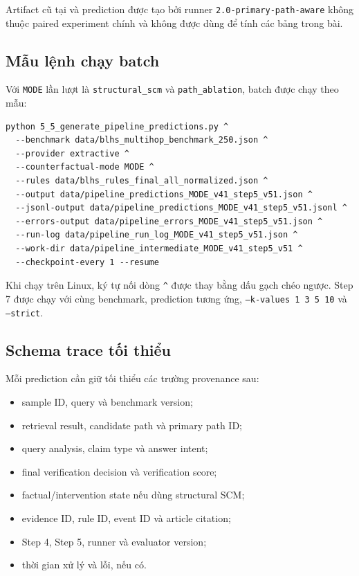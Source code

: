 Artifact cũ tại
 và prediction được tạo bởi
runner \texttt{2.0-primary-path-aware} không thuộc paired experiment chính
và không được dùng để tính các bảng trong bài.

\subsection{Mẫu lệnh chạy batch}

Với \texttt{MODE} lần lượt là \texttt{structural\_scm} và
\texttt{path\_ablation}, batch được chạy theo mẫu:

\begin{verbatim}
python 5_5_generate_pipeline_predictions.py ^
  --benchmark data/blhs_multihop_benchmark_250.json ^
  --provider extractive ^
  --counterfactual-mode MODE ^
  --rules data/blhs_rules_final_all_normalized.json ^
  --output data/pipeline_predictions_MODE_v41_step5_v51.json ^
  --jsonl-output data/pipeline_predictions_MODE_v41_step5_v51.jsonl ^
  --errors-output data/pipeline_errors_MODE_v41_step5_v51.json ^
  --run-log data/pipeline_run_log_MODE_v41_step5_v51.json ^
  --work-dir data/pipeline_intermediate_MODE_v41_step5_v51 ^
  --checkpoint-every 1 --resume
\end{verbatim}

Khi chạy trên Linux, ký tự nối dòng \texttt{\^{}} được thay bằng dấu gạch
chéo ngược. Step 7 được chạy với cùng benchmark, prediction tương ứng,
\texttt{--k-values 1 3 5 10} và \texttt{--strict}.

\subsection{Schema trace tối thiểu}

Mỗi prediction cần giữ tối thiểu các trường provenance sau:

\begin{itemize}
    \item sample ID, query và benchmark version;
    \item retrieval result, candidate path và primary path ID;
    \item query analysis, claim type và answer intent;
    \item final verification decision và verification score;
    \item factual/intervention state nếu dùng structural SCM;
    \item evidence ID, rule ID, event ID và article citation;
    \item Step 4, Step 5, runner và evaluator version;
    \item thời gian xử lý và lỗi, nếu có.
\end{itemize}

